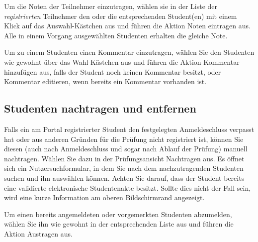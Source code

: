 \documentclass[a4paper,11pt]{article}
\newcommand{\knopf}[1]{{\sc #1}}
\begin{document}
Um die Noten der Teilnehmer einzutragen, wählen sie in der Liste der {\em
  registrierten} Teilnehmer den oder die entsprechenden Student(en) mit einem
Klick auf das Auswahl-Kästchen aus und führen die Aktion \knopf{Noten
  eintragen} aus. Alle in einem Vorgang ausgewählten Studenten erhalten die
gleiche Note.

Um zu einem Studenten einen Kommentar einzutragen, wählen Sie den Studenten
wie gewohnt über das Wahl-Kästchen aus und führen die Aktion \knopf{Kommentar
  hinzufügen} aus, falls der Student noch keinen Kommentar besitzt, oder
\knopf{Kommentar editieren}, wenn bereits ein Kommentar vorhanden ist.

\subsection{Studenten nachtragen und entfernen}

Falls ein am Portal registrierter Student den festgelegten Anmeldeschluss
verpasst hat oder aus anderen Gründen für die Prüfung nicht registriert ist,
können Sie diesen (auch nach Anmeldeschluss und sogar nach Ablauf der Prüfung)
manuell nachtragen. Wählen Sie dazu in der Prüfungsansicht \knopf{Nachtragen}
aus. Es öffnet sich ein Nutzersuchformular, in dem Sie nach dem
nachzutragenden Studenten suchen und ihn auswählen können. Achten Sie darauf,
dass der Student bereits eine validierte elektronische Studentenakte
besitzt. Sollte dies nicht der Fall sein, wird eine kurze Information am
oberen Bildschirmrand angezeigt.

Um einen bereits angemeldeten oder vorgemerkten Studenten abzumelden, wählen
Sie ihn wie gewohnt in der entsprechenden Liste aus und führen die Aktion
\knopf{Austragen} aus.
\end{document}

